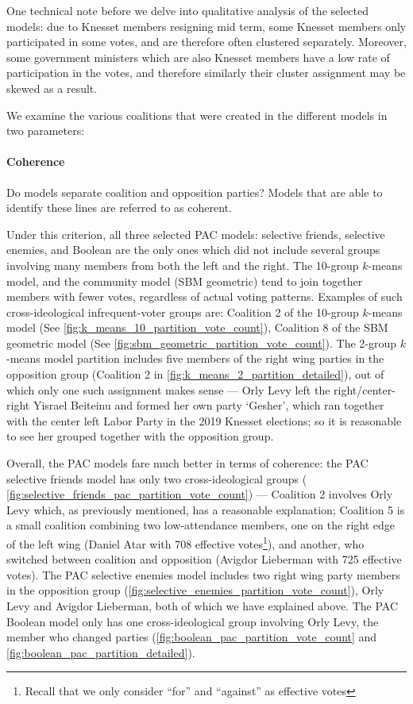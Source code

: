One technical note before we delve into qualitative analysis of the selected
models: due to Knesset members resigning mid term, some Knesset members only participated in some votes, and are therefore often clustered separately.
Moreover, some government ministers which are also Knesset members have a low
rate of participation in the votes, and therefore similarly their cluster
assignment may be skewed as a result.

We examine the various coalitions that were created in the different models in two parameters:

\paragraph{Coherence}
Do models separate coalition and opposition parties? Models that are able to identify these lines are referred to as coherent.

Under this criterion, all three selected PAC models: selective friends,
selective enemies, and Boolean are the only ones which did not include several
groups involving many members from both the left and the right.
The 10-group $k$-means model, and the community model (SBM geometric) tend to
join together members with fewer votes, regardless of actual voting patterns.
Examples of such cross-ideological infrequent-voter groups are: Coalition 2
of the 10-group $k$-means model (See \autoref{fig:k_means_10_partition_vote_count}),
Coalition 8 of the SBM geometric model (See
\autoref{fig:sbm_geometric_partition_vote_count}).
The 2-group $k$-means model partition includes five members of the right wing
parties in the opposition group (Coalition 2 in
\autoref{fig:k_means_2_partition_detailed}), out of which only one such
assignment makes sense --- Orly Levy left the right/center-right Yisrael
Beiteinu and formed her own party `Gesher', which ran together with the center
left Labor Party in the 2019 Knesset elections\cite{knesset:levy, wiki:levy};
so it is reasonable to see her grouped together with the opposition group.

Overall, the PAC models fare much better in terms of coherence:
the PAC selective friends model has only two cross-ideological groups (
\autoref{fig:selective_friends_pac_partition_vote_count}) ---
Coalition 2 involves Orly Levy which, as previously mentioned, has a reasonable
explanation; Coalition 5 is a small coalition combining two low-attendance
members, one on the right edge of the left wing (Daniel Atar with 708 effective
votes\footnote{Recall that we only consider ``for'' and ``against'' as
effective votes}), and another, who switched between coalition and opposition
\cite{knesset:lieberman, wiki:lieberman} (Avigdor Lieberman with 725 effective
votes).
The PAC selective enemies model includes two right wing party members in the
opposition group (\autoref{fig:selective_enemies_partition_vote_count}),
Orly Levy and Avigdor Lieberman, both of which we have explained above.
The PAC Boolean model only has one cross-ideological group involving Orly Levy,
the member who changed parties (\autoref{fig:boolean_pac_partition_vote_count}
and \autoref{fig:boolean_pac_partition_detailed}).

